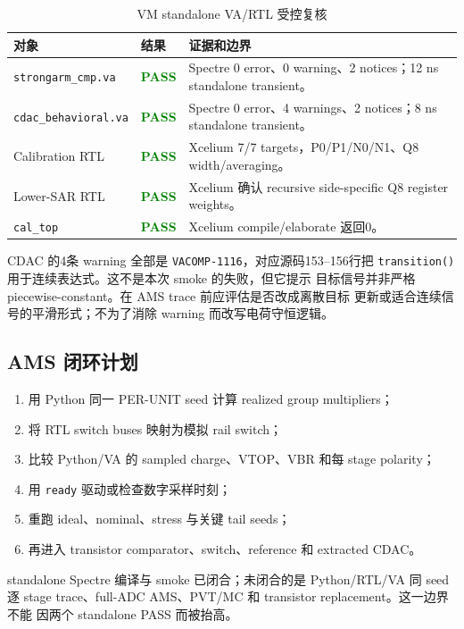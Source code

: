 \documentclass[UTF8,11pt,a4paper]{ctexart}
\newcommand{\statuspass}{\textcolor{Green}{\textbf{PASS}}}
\newcommand{\code}[1]{\texttt{\small #1}}
\newcommand{\tablehead}{\rowcolor{PaleBlue}\bfseries\sffamily\color{DeepNavy}}
\begin{document}
\begin{table}[htbp]
  \centering
  \caption{VM standalone VA/RTL 受控复核}
  \begin{tabularx}{\textwidth}{@{}p{39mm}C{22mm}Y@{}}
    \toprule
    \tablehead 对象 & 结果 & 证据和边界\\
    \midrule
    \code{strongarm\_cmp.va} & \statuspass &
      Spectre 0 error、0 warning、2 notices；12 ns standalone transient。\\
    \code{cdac\_behavioral.va} & \statuspass &
      Spectre 0 error、4 warnings、2 notices；8 ns standalone transient。\\
    Calibration RTL & \statuspass &
      Xcelium 7/7 targets，P0/P1/N0/N1、Q8 width/averaging。\\
    Lower-SAR RTL & \statuspass &
      Xcelium 确认 recursive side-specific Q8 register weights。\\
    \code{cal\_top} & \statuspass &
      Xcelium compile/elaborate 返回0。\\
    \bottomrule
  \end{tabularx}
\end{table}

CDAC 的4条 warning 全部是 \code{VACOMP-1116}，对应源码153--156行把
\code{transition()} 用于连续表达式。这不是本次 smoke 的失败，但它提示
目标信号并非严格 piecewise-constant。在 AMS trace 前应评估是否改成离散目标
更新或适合连续信号的平滑形式；不为了消除 warning 而改写电荷守恒逻辑。

\subsection{AMS 闭环计划}

\begin{enumerate}
  \item 用 Python 同一 PER-UNIT seed 计算 realized group multipliers；
  \item 将 RTL switch buses 映射为模拟 rail switch；
  \item 比较 Python/VA 的 sampled charge、VTOP、VBR 和每 stage polarity；
  \item 用 \code{ready} 驱动或检查数字采样时刻；
  \item 重跑 ideal、nominal、stress 与关键 tail seeds；
  \item 再进入 transistor comparator、switch、reference 和 extracted CDAC。
\end{enumerate}

\begin{notebox}
  standalone Spectre 编译与 smoke 已闭合；未闭合的是 Python/RTL/VA 同 seed
  逐 stage trace、full-ADC AMS、PVT/MC 和 transistor replacement。这一边界不能
  因两个 standalone PASS 而被抬高。
\end{notebox}
\end{document}
